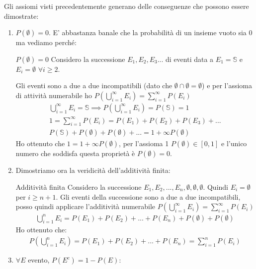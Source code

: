 Gli assiomi visti precedentemente generano delle conseguenze che possono essere dimostrate:
\begin{enumerate}
    \item $P(\emptyset)=0$. E' abbastanza banale che la probabilità di un insieme vuoto sia 0 ma vediamo perché:
    \begin{Demonstration}{$P(\emptyset)=0$}{}
        Considero la successione $E_1,E_2,E_3...$ di eventi data a $E_1=\mathbb{S}$ e $E_i=\emptyset$ $\forall i\geq 2$.

        Gli eventi sono a due a due incompatibili (dato che $\emptyset\cap\emptyset=\emptyset$) e per l'assioma di attività numerabile ho $P(\bigcup^\infty_{i=1}E_i)=\sum^\infty_{i=1}P(E_i)$
        \begin{align*}
            \bigcup^\infty_{i=1}E_i=\mathbb{S}\implies P(\bigcup^\infty_{i=1}E_i)=P(\mathbb{S})=1\\
            1=\sum^\infty_{i=1}P(E_i)=P(E_1)+P(E_2)+P(E_3)+...\\
            P(\mathbb{S})+P(\emptyset)+P(\emptyset)+...=1+\infty P(\emptyset)
        \end{align*}
        Ho ottenuto che $1=1+\infty P(\emptyset)$, per l'assioma 1 $P(\emptyset)\in[0,1]$ e l'unico numero che soddisfa questa proprietà è $P(\emptyset)=0$.
    \end{Demonstration}
    
    \item Dimostriamo ora la veridicità dell'additività finita:
    
    \begin{Demonstration}{Additività finita}{}
        Considero la successione $E_1, E_2, ..., E_n, \emptyset, \emptyset, \emptyset$. Quindi $E_i=\emptyset$ per $i\geq n+1$. Gli eventi della successione sono a due a due incompatibili, posso quindi applicare l'additività numerabile $P(\bigcup^\infty_{i=1}E_i)=\sum^\infty_{i=1}P(E_i)$
        \begin{align*}
            \bigcup^n_{i=1}E_i=P(E_1)+P(E_2)+...+P(E_n)+P(\emptyset)+P(\emptyset)
        \end{align*}
        Ho ottenuto che:
        \begin{align*}
            P(\bigcup^n_{i=1}E_i)=P(E_1)+P(E_2)+...+P(E_n)=\sum^n_{i=1}P(E_i)    
        \end{align*}
    \end{Demonstration}
    \item $\forall E$ evento, $P(E^c)=1-P(E)$:
    

\end{enumerate}
